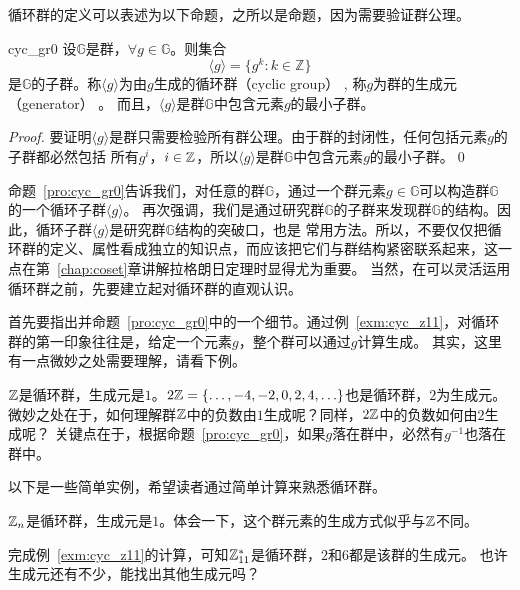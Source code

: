 循环群的定义可以表述为以下命题，之所以是命题，因为需要验证群公理。
\begin{proposition}{}{cyc_gr0}
		设$\mathbb{G}$是群，$\forall g \in \mathbb{G} $。则集合
		\[\langle g \rangle = \{ g^k: k \in \mathbb{Z} \}\]
		    是$\mathbb{G}$的子群。称$\langle g \rangle$为由$g$生成的循环群（cyclic group） , 
	    称$g$为群的生成元（generator） 。
	    而且，$\langle g \rangle$是群$\mathbb{G}$中包含元素$g$的最小子群。
\end{proposition}
\begin{proof}
	       要证明$\langle g \rangle$是群只需要检验所有群公理。由于群的封闭性，任何包括元素$g$的子群都必然包括
	       所有$g^i$，$i \in {\mathbb Z}$，所以$\langle g \rangle$是群$\mathbb{G}$中包含元素$g$的最小子群。\qed
\end{proof}

命题~\ref{pro:cyc_gr0}告诉我们，对任意的群$\mathbb{G}$，通过一个群元素$g\in \mathbb{G}$可以构造群$\mathbb{G}$的一个循环子群$\langle g \rangle$。
再次强调，我们是通过研究群$\mathbb{G}$的子群来发现群$\mathbb{G}$的结构。因此，循环子群$\langle g \rangle$是研究群$\mathbb{G}$结构的突破口，也是
常用方法。所以，不要仅仅把循环群的定义、属性看成独立的知识点，而应该把它们与群结构紧密联系起来，这一点在第~\ref{chap:coset}章讲解拉格朗日定理时显得尤为重要。
当然，在可以灵活运用循环群之前，先要建立起对循环群的直观认识。

首先要指出并命题~\ref{pro:cyc_gr0}中的一个细节。通过例~\ref{exm:cyc_z11}，对循环群的第一印象往往是，给定一个元素$g$，整个群可以通过$g$计算生成。
其实，这里有一点微妙之处需要理解，请看下例。
\begin{example}
	${\mathbb Z}$是循环群，生成元是$1$。$2{\mathbb Z} = \{\ldots, -4, -2, 0, 2, 4, \ldots\}$也是循环群，$2$为生成元。
微妙之处在于，如何理解群${\mathbb Z}$中的负数由$1$生成呢？同样，$2{\mathbb Z}$中的负数如何由$2$生成呢？
关键点在于，根据命题~\ref{pro:cyc_gr0}，如果$g$落在群中，必然有$g^{-1}$也落在群中。
\end{example}

以下是一些简单实例，希望读者通过简单计算来熟悉循环群。
\begin{example}
${\mathbb Z}_n$是循环群，生成元是$1$。体会一下，这个群元素的生成方式似乎与${\mathbb Z}$不同。
\end{example}

\begin{example}
完成例~\ref{exm:cyc_z11}的计算，可知${\mathbb Z}_{11}^*$是循环群，$2$和$6$都是该群的生成元。
也许生成元还有不少，能找出其他生成元吗？
\end{example}

